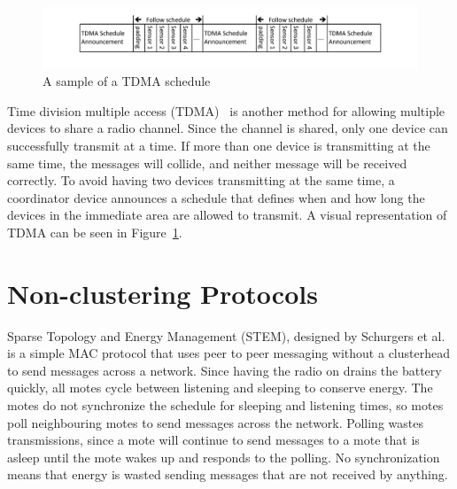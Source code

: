 \begin{figure}[bth]
	\centering
		\includegraphics[width=5.5in]{images/relatedWork/tdmaSchedule.pdf}
	\caption{A sample of a TDMA schedule}
	\label{fig:images_relatedWork_tdmaSchedulev003}
\end{figure}

Time division multiple access (TDMA)~\cite{TDMA} is another method for allowing multiple 
devices to share a radio channel. Since the channel is shared, only one device can successfully
transmit at a time. If more than one device is transmitting at the same time, the messages
will collide, and neither message will be received correctly. To avoid having two devices
transmitting at the same time, a coordinator device announces a schedule that defines when and how long
the devices in the immediate area are allowed to transmit.
A visual representation of TDMA can be seen in Figure~\ref{fig:images_relatedWork_tdmaSchedulev003}.




\section{Non-clustering Protocols}

Sparse Topology and Energy Management (STEM), designed by Schurgers et al.~\cite{stem} is a simple MAC protocol that uses peer to peer messaging without a clusterhead to 
send messages across a network. 
Since having the radio on drains the battery quickly, all motes cycle between listening and sleeping to conserve energy. The motes do not synchronize 
the schedule for sleeping and listening times, so motes poll neighbouring motes to send messages 
across the network. Polling wastes transmissions, since a mote will continue to send messages to a mote that is asleep until the 
mote wakes up and responds to the polling. No synchronization means that energy is wasted sending 
messages that are not received by anything.

